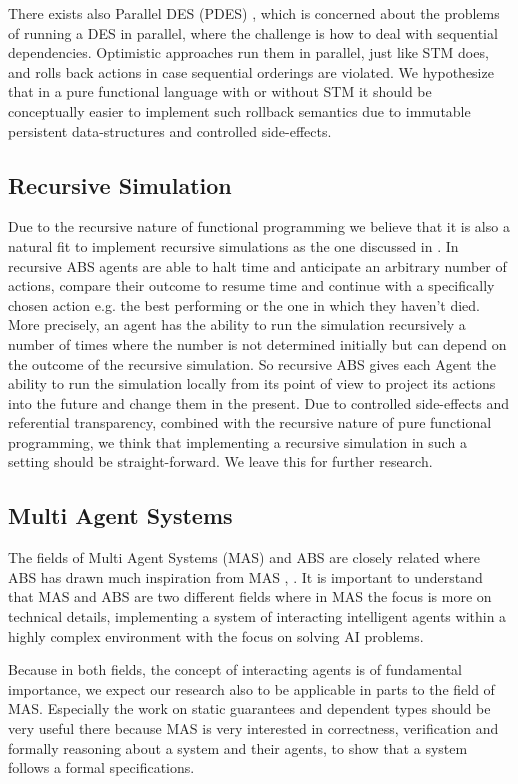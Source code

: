 There exists also Parallel DES (PDES) \cite{fujimoto_parallel_2017}, which is concerned about the problems of running a DES in parallel, where the challenge is how to deal with sequential dependencies. Optimistic approaches run them in parallel, just like STM does, and rolls back actions in case sequential orderings are violated. We hypothesize that in a pure functional language with or without STM it should be conceptually easier to implement such rollback semantics due to immutable persistent data-structures and controlled side-effects.
 
\subsection{Recursive Simulation}
Due to the recursive nature of functional programming we believe that it is also a natural fit to implement recursive simulations as the one discussed in \cite{gilmer_recursive_2000}. In recursive ABS agents are able to halt time and anticipate an arbitrary number of actions, compare their outcome to resume time and continue with a specifically chosen action e.g. the best performing or the one in which they haven't died. More precisely, an agent has the ability to run the simulation recursively a number of times where the number is not determined initially but can depend on the outcome of the recursive simulation. So recursive ABS gives each Agent the ability to run the simulation locally from its point of view to project its actions into the future and change them in the present. Due to controlled side-effects and referential transparency, combined with the recursive nature of pure functional programming, we think that implementing a recursive simulation in such a setting should be straight-forward. We leave this for further research.

\subsection{Multi Agent Systems}
The fields of Multi Agent Systems (MAS) and ABS are closely related where ABS has drawn much inspiration from MAS \cite{wooldridge_introduction_2009}, \cite{weiss_multiagent_2013}. It is important to understand that MAS and ABS are two different fields where in MAS the focus is more on technical details, implementing a system of interacting intelligent agents within a highly complex environment with the focus on solving AI problems.

Because in both fields, the concept of interacting agents is of fundamental importance, we expect our research also to be applicable in parts to the field of MAS. Especially the work on static guarantees and dependent types should be very useful there because MAS is very interested in correctness, verification and formally reasoning about a system and their agents, to show that a system follows a formal specifications.